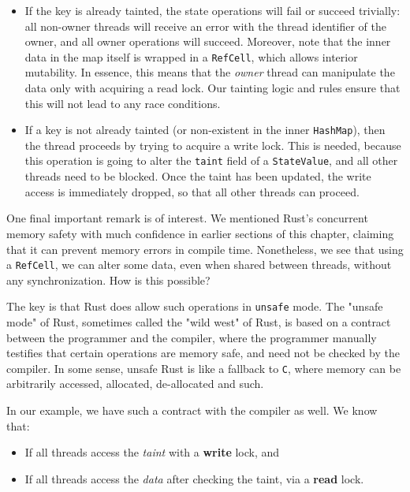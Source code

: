 \begin{itemize}
	\item If the key is already tainted, the state operations will fail or succeed trivially: all
	non-owner threads will receive an error with the thread identifier of the owner, and all owner
	operations will succeed. Moreover, note that the inner data in the map itself is wrapped in a
	\texttt{RefCell}, which allows interior mutability\cite{RefCellInteriorMutability}. In essence,
	this means that the \textit{owner} thread can manipulate the data only with acquiring a read
	lock. Our tainting logic and rules ensure that this will not lead to any race conditions.

	\item If a key is not already tainted (or non-existent in the inner \texttt{HashMap}), then the
	thread proceeds by trying to acquire a write lock. This is needed, because this operation is
	going to alter the \texttt{taint} field of a \texttt{StateValue}, and all other threads need to
	be blocked. Once the taint has been updated, the write access is immediately dropped, so that
	all other threads can proceed.
\end{itemize}

One final important remark is of interest. We mentioned Rust's concurrent memory safety with much
confidence in earlier sections of this chapter, claiming that it can prevent memory errors in
compile time. Nonetheless, we see that using a \texttt{RefCell}, we can alter some data, even when
shared between threads, without any synchronization. How is this possible?

The key is that Rust does allow such operations in \texttt{unsafe} mode. The "unsafe mode" of Rust,
sometimes called the "wild west" of Rust, is based on a contract between the programmer and the
compiler, where the programmer manually testifies that certain operations are memory safe, and need
not be checked by the compiler. In some sense, unsafe Rust is like a fallback to \texttt{C}, where
memory can be arbitrarily accessed, allocated, de-allocated and such.

In our example, we have such a contract with the compiler as well. We know that:

\begin{itemize}
	\item If all threads access the \textit{taint} with a \textbf{write} lock, and
	\item If all threads access the \textit{data} after checking the taint, via a \textbf{read} lock.
\end{itemize}

